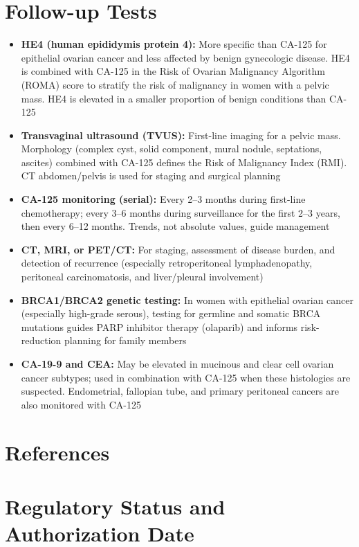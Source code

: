 \section*{Follow-up Tests}
\begin{itemize}
  \item \textbf{HE4 (human epididymis protein 4):} More specific than CA-125 for epithelial ovarian cancer and less affected by benign gynecologic disease. HE4 is combined with CA-125 in the Risk of Ovarian Malignancy Algorithm (ROMA) score to stratify the risk of malignancy in women with a pelvic mass. HE4 is elevated in a smaller proportion of benign conditions than CA-125
  \item \textbf{Transvaginal ultrasound (TVUS):} First-line imaging for a pelvic mass. Morphology (complex cyst, solid component, mural nodule, septations, ascites) combined with CA-125 defines the Risk of Malignancy Index (RMI). CT abdomen/pelvis is used for staging and surgical planning
  \item \textbf{CA-125 monitoring (serial):} Every 2--3 months during first-line chemotherapy; every 3--6 months during surveillance for the first 2--3 years, then every 6--12 months. Trends, not absolute values, guide management
  \item \textbf{CT, MRI, or PET/CT:} For staging, assessment of disease burden, and detection of recurrence (especially retroperitoneal lymphadenopathy, peritoneal carcinomatosis, and liver/pleural involvement)
  \item \textbf{BRCA1/BRCA2 genetic testing:} In women with epithelial ovarian cancer (especially high-grade serous), testing for germline and somatic BRCA mutations guides PARP inhibitor therapy (olaparib) and informs risk-reduction planning for family members
  \item \textbf{CA-19-9 and CEA:} May be elevated in mucinous and clear cell ovarian cancer subtypes; used in combination with CA-125 when these histologies are suspected. Endometrial, fallopian tube, and primary peritoneal cancers are also monitored with CA-125
\end{itemize}

\section*{References}



\clearpage
\section*{Regulatory Status and Authorization Date}

\clearpage
